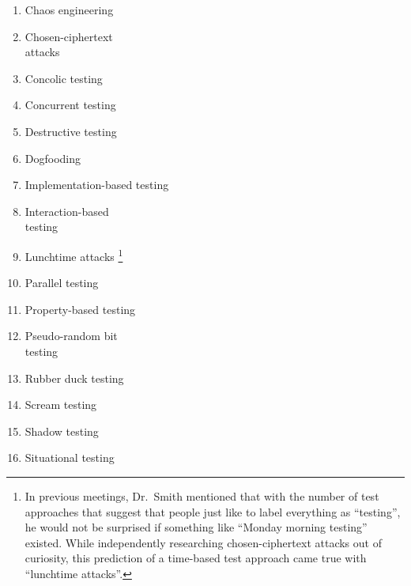 \begin{minipage}{\linewidth}
    \begin{multicols}{2}
        \begin{enumerate}
            \item Chaos engineering
            \item Chosen-ciphertext \ifnotpaper\else \\ \fi attacks
            \item Concolic testing
            \item Concurrent testing
            \item Destructive testing
            \item Dogfooding
            \item Implementation-based testing
            \item Interaction-based \ifnotpaper\else \\ \fi testing
                  \ifnotpaper\else\columnbreak\fi
            \item Lunchtime attacks\ifnotpaper%
                      \footnote{In previous meetings, Dr.~Smith mentioned
                          that with the number of test approaches that suggest
                          that people just like to label everything as
                          ``testing'', he would not be surprised if something
                          like ``Monday morning testing'' existed. While
                          independently researching chosen-ciphertext attacks
                          out of curiosity, this prediction of a time-based
                          test approach came true with ``lunchtime attacks''.}
                  \fi
            \item Parallel testing
            \item Property-based testing
            \item Pseudo-random bit \ifnotpaper\else \\ \fi testing
            \item Rubber duck testing
            \item Scream testing
            \item Shadow testing
            \item Situational testing
        \end{enumerate}
    \end{multicols}
\end{minipage}
